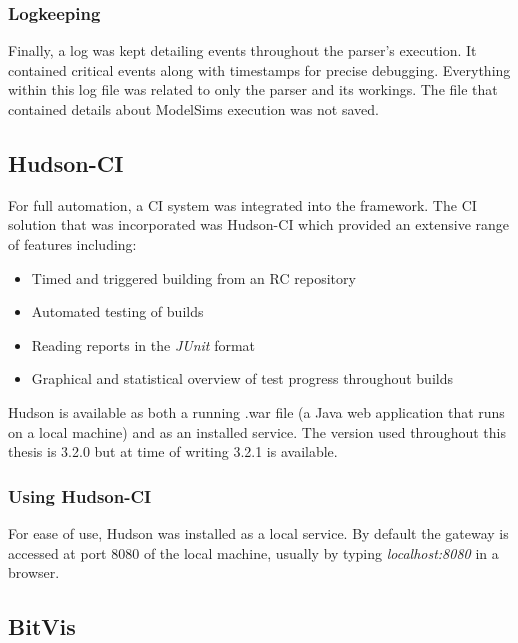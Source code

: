 \documentclass[11pt,british]{article}
\begin{document}
\subsubsection{Logkeeping}
Finally, a log was kept detailing events throughout the parser's execution. It contained critical events along with timestamps for precise debugging. Everything within this log file was related to only the parser and its workings. The file that contained details about ModelSims execution was not saved.

\subsection{Hudson-CI}
\label{subsec:Hudson}
For full automation, a \gls{CI} system was integrated into the framework. The \gls{CI} solution that was incorporated was Hudson-CI which provided an extensive range of features including:
\begin{itemize}%
\item Timed and triggered building from an \gls{RC} repository
\item Automated testing of builds
\item Reading reports in the \emph{JUnit} format
\item Graphical and statistical overview of test progress throughout builds
\end{itemize}
Hudson is available as both a running .war file (a Java web application that runs on a local machine) and as an installed service.\cite{hudson} The version used throughout this thesis is 3.2.0 but at time of writing 3.2.1 is available.

\subsubsection{Using Hudson-CI}
For ease of use, Hudson was installed as a local service. By default the gateway is accessed at port 8080 of the local machine, usually by typing \emph{localhost:8080} in a browser.

\subsection{BitVis}
\label{subsec:bitvis}




%
\end{document}
